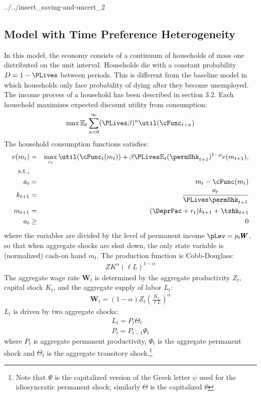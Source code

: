 \documentclass[../../cjSOE.tex]{subfiles}
\begin{document}
\begin{verbatimwrite}{../../insert_saving-and-uncert_2}
\subsection{Model with Time Preference Heterogeneity}

In this model, the economy consists of a continuum of households of mass one distributed on the unit interval. Households die with a constant probability $D=1-\PLives$ between periods. This is different from the baseline model in which households only face probability of dying after they become unemployed. The income process of a household has been described in section 3.2. Each household maximizes expected discount utility from consumption:
\begin{eqnarray}
\max\mathbb{E}_{t}\sum_{n=0}^{\infty}(\PLives\beta)^{n}\util(\cFunc_{t+n})
\end{eqnarray}
The household consumption functions satisfies:
\begin{eqnarray}
v(m_{t}) & = & \max_{c_{t}} \util(\cFunc_{t}(m_{t}))+\beta\PLives\mathbb{E}_{t}(\permShk_{t+1})^{1-\rho}v(m_{t+1}), \label{eq:tran}
\\ \text{s.t.}, \nonumber
\\a_{t} & = & m_{t}-\cFunc(m_{t})
\\k_{t+1} & = & \frac{a_{t}}{\PLives \permShk_{t+1}}
\\m_{t+1} & = & (\DeprFac+r_{t})k_{t+1}+\tshk_{t+1}
\\a_{t} & \geq & 0
\end{eqnarray}
where the variables are divided by the level of permanent income $\pLev = p_{t}\pmb{W}$, so that
when aggregate shocks are shut down, the only state variable is (normalized) cash-on hand $m_{t}$.
The production function is Cobb-Douglass:
\begin{align}
ZK^{\alpha}(\ell L)^{1-\alpha}
\end{align}
The aggregate wage rate $\pmb{W}_{t}$ is determined by the aggregate productivity $Z_{t}$, capital stock $K_{t}$, and the aggregate supply of labor $L_{t}$:
\begin{align}
\pmb{W}_{t}=(1-\alpha)Z_{t}(\frac{K_{t}}{\ell L})^{\alpha}
\end{align}
$L_{t}$ is driven by two aggregate shocks:
\begin{align}
L_{t}=P_{t}\Theta_{t}
\\P_{t}=P_{t-1}\Psi_{t}
\end{align}
where $P_{t}$ is aggregate permanent productivity, 	$\Psi_{t}$ is the aggregate permanent shock
and $\Theta_{t}$ is the aggregate transitory shock.\footnote{Note that $\Psi$ is the capitalized version of the Greek letter $\psi$ used for the idiosyncratic permanent shock; similarly $\Theta$ is the capitalized $\theta$}

\end{verbatimwrite}




\end{document}
